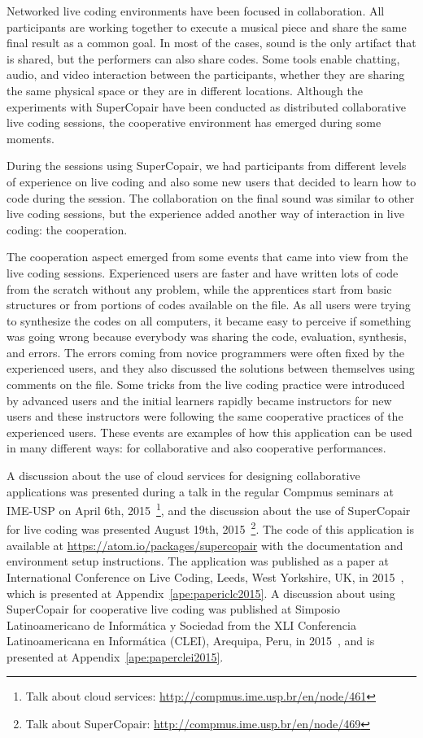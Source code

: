 Networked live coding environments have been focused in collaboration.
All participants are working together to execute a musical piece and share the same final result as a common goal.
In most of the cases, sound is the only artifact that is shared, but the performers can also share codes.
Some tools enable chatting, audio, and video interaction between the participants, whether they are sharing the same physical space or they are in different locations.
Although the experiments with SuperCopair have been conducted as distributed collaborative live coding sessions, the cooperative environment has emerged during some moments.

During the sessions using SuperCopair, we had participants from different levels of experience on live coding and also some new users that decided to learn how to code during the session.
The collaboration on the final sound was similar to other live coding sessions, but the experience added another way of interaction in live coding: the cooperation. 

The cooperation aspect emerged from some events that came into view from the live coding sessions.
Experienced users are faster and have written lots of code from the scratch without any problem, while the apprentices start from basic structures or from portions of codes available on the file.
As all users were trying to synthesize the codes on all computers, it became easy to perceive if something was going wrong because everybody was sharing the code, evaluation, synthesis, and errors.
The errors coming from novice programmers were often fixed by the experienced users, and they also discussed the solutions between themselves using comments on the file.
Some tricks from the live coding practice were introduced by advanced users and the initial learners rapidly became instructors for new users and these instructors were following the same cooperative practices of the experienced users.
These events are examples of how this application can be used in many different ways: for collaborative and also cooperative performances.

A discussion about the use of cloud services for designing collaborative applications was presented during a talk in the regular Compmus seminars at IME-USP on April 6th, 2015~\footnote{Talk about cloud services: \url{http://compmus.ime.usp.br/en/node/461}}, and the discussion about the use of SuperCopair for live coding was presented August 19th, 2015~\footnote{Talk about SuperCopair: \url{http://compmus.ime.usp.br/en/node/469}}.
The code of this application is available at \url{https://atom.io/packages/supercopair} with the documentation and environment setup instructions.
The application was published as a paper at International Conference on Live Coding, Leeds, West Yorkshire, UK, in 2015~\citep{deCarvalhoJunior2015supercopair}, which is presented at Appendix~\ref{ape:papericlc2015}.
A discussion about using SuperCopair for cooperative live coding was published at Simposio Latinoamericano de Informática y Sociedad from the XLI Conferencia Latinoamericana en Informática (CLEI), Arequipa, Peru, in 2015~\citep{deCarvalhoJunior2015cooperative}, and is presented at Appendix~\ref{ape:paperclei2015}.

